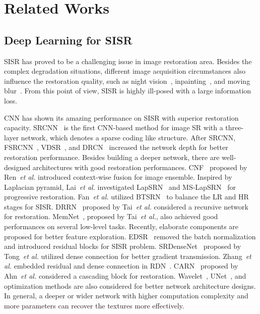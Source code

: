 \documentclass[journal]{IEEEtran}
\begin{document}
\section{Related Works}
\subsection{Deep Learning for SISR} 
SISR has proved to be a challenging issue in image restoration area. Besides the complex degradation situations, different image acquisition circumstances also influence the restoration quality, such as night vision~\cite{review1_1}, inpainting~\cite{review1_2}, and moving blur~\cite{review1_3}. From this point of view, SISR is highly ill-posed with a large information loss.

CNN has shown its amazing performance on SISR with superior restoration capacity. SRCNN~\cite{srcnn} is the first CNN-based method for image SR with a three-layer network, which denotes a sparse coding like structure. After SRCNN, FSRCNN~\cite{fsrcnn}, VDSR~\cite{vdsr}, and DRCN~\cite{drcn_ghifary2016deep} increased the network depth for better restoration performance. Besides building a deeper network, there are well-designed architectures with good restoration performances.  CNF~\cite{cnf_ren2017image} proposed by Ren~\textit{et al.} introduced context-wise fusion for image ensemble. Inspired by Laplacian pyramid, Lai~\textit{et al.} investigated LapSRN~\cite{lapsrn} and MS-LapSRN~\cite{ms-lapsrn} for progressive restoration. Fan~\textit{et al.} utilized BTSRN~\cite{btsrn_fan2017balanced} to balance the LR and HR stages for SISR. DRRN~\cite{drrn_tai2017image} proposed by Tai~\textit{et al.} considered a recursive network for restoration. MemNet~\cite{memnet}, proposed by Tai~\textit{et al.}, also achieved good performances on several low-level tasks. Recently, elaborate components are proposed for better feature exploration. EDSR~\cite{edsr_lim2017} removed the batch normalization and introduced residual blocks for SISR problem. SRDenseNet~\cite{srdensenet} proposed by Tong~\textit{et al.} utilized dense connection for better gradient transmission. Zhang~\textit{et al.} embedded residual and dense connection in RDN~\cite{rdn_zhang2018}. CARN~\cite{carn} proposed by Ahn~\textit{et al.} considered a cascading block for restoration. 
Wavelet~\cite{review2_1}, UNet~\cite{review2_7}, and optimization methods\cite{review2_2} are also considered for better network architecture designs.
In general, a deeper or wider network with higher computation complexity and more parameters can recover the textures more effectively.
\end{document}
